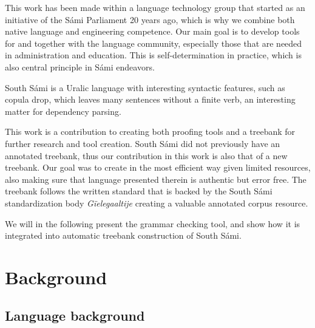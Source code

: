 \documentclass[free]{flammie}
\begin{document}
This work has been made within a language technology group that started as an
initiative of the Sámi Parliament 20 years ago, which is why we combine both
native language and engineering competence. Our main goal is to develop tools
for and together with the language community, especially those that are needed
in administration and education. This is self-determination in practice, which
is also central principle in Sámi endeavors.

South Sámi is a Uralic language with interesting syntactic features, such as
copula drop, which leaves many sentences without a finite verb, an interesting
matter for dependency parsing.

This work is a contribution to creating both proofing tools and a treebank for
further research and tool creation.  South Sámi did not previously have an
annotated treebank, thus our contribution in this work is also that of a new
treebank.  Our goal was to create in the most efficient way given limited
resources, also making sure that language presented therein is authentic but
error free.  The treebank follows the written standard that is backed by the
South Sámi standardization body \textit{Gïelegaaltije} creating a valuable
annotated corpus resource.

We will in the following present the grammar checking tool, and show how it is
integrated into automatic treebank construction of South Sámi.

\section{Background}

\subsection{Language background}
\end{document}
